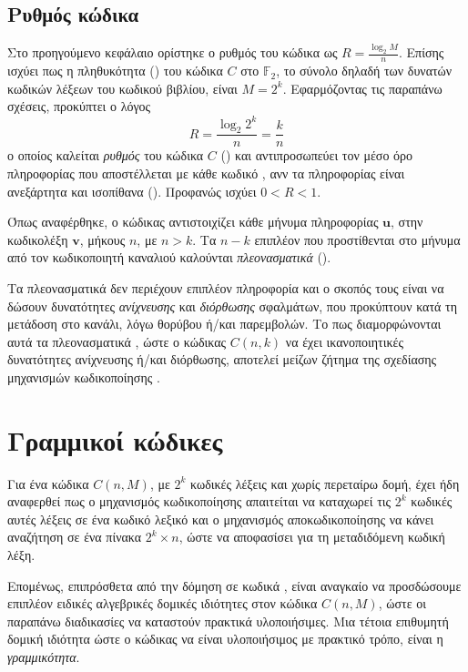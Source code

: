 \subsection{Ρυθμός κώδικα}
Στο προηγούμενο κεφάλαιο ορίστηκε ο ρυθμός του κώδικα ως $R=\frac{\log_{2}M}{n}$. Επίσης ισχύει πως η πληθυκότητα () του  κώδικα $C$ στο $\mathbb{F}_2$, το σύνολο δηλαδή των δυνατών κωδικών λέξεων του κωδικού βιβλίου, είναι $M=2^k$. Εφαρμόζοντας τις παραπάνω σχέσεις, προκύπτει ο λόγος
\begin{equation}
R = \frac{\log_{2}2^{k}}{n} = \frac{k}{n}
\label{eq:code rate}
\end{equation}
ο οποίος καλείται \textit{ρυθμός} του  κώδικα $C$ () και αντιπροσωπεύει τον μέσο όρο πληροφορίας που αποστέλλεται με κάθε κωδικό , ανν τα  πληροφορίας είναι ανεξάρτητα και ισοπίθανα (). Προφανώς ισχύει $0<R<1$.

\vspace{5mm}

Όπως αναφέρθηκε, ο κώδικας αντιστοιχίζει κάθε μήνυμα πληροφορίας $\mathbf{u}$, στην κωδικολέξη $\mathbf{v}$, μήκους $n$, με $n>k$. Tα $n-k$ επιπλέον  που προστίθενται στο μήνυμα από τον κωδικοποιητή καναλιού καλούνται \textit{πλεονασματικά} ().

Τα πλεονασματικά  δεν περιέχουν επιπλέον πληροφορία και ο σκοπός τους είναι να δώσουν δυνατότητες \textit{ανίχνευσης} και \textit{διόρθωσης} σφαλμάτων, που προκύπτουν κατά τη μετάδοση στο κανάλι, λόγω θορύβου ή/και παρεμβολών. Το πως διαμορφώνονται αυτά τα πλεονασματικά , ώστε ο  κώδικας $C(n,k)$ να έχει ικανοποιητικές δυνατότητες ανίχνευσης ή/και διόρθωσης, αποτελεί μείζων ζήτημα της σχεδίασης μηχανισμών κωδικοποίησης \cite{ryan2009channel}.

\section{Γραμμικοί  κώδικες}
Για ένα  κώδικα $C(n,M)$, με $2^k$ κωδικές λέξεις και χωρίς περεταίρω δομή, έχει ήδη αναφερθεί πως ο μηχανισμός κωδικοποίησης απαιτείται να καταχωρεί τις $2^k$ κωδικές αυτές λέξεις σε ένα κωδικό λεξικό και ο μηχανισμός αποκωδικοποίησης να κάνει αναζήτηση σε ένα πίνακα $2^k\times{n}$, ώστε να αποφασίσει για τη μεταδιδόμενη κωδική λέξη.

Επομένως, επιπρόσθετα από την δόμηση σε κωδικά , είναι αναγκαίο να προσδώσουμε επιπλέον ειδικές αλγεβρικές δομικές ιδιότητες στον κώδικα $C(n,M)$, ώστε οι παραπάνω διαδικασίες να καταστούν πρακτικά υλοποιήσιμες. Μια τέτοια επιθυμητή δομική ιδιότητα ώστε ο  κώδικας να είναι υλοποιήσιμος με πρακτικό τρόπο, είναι η \textit{γραμμικότητα}.

